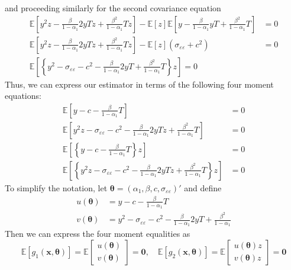 \documentclass[12pt]{article}
\begin{document}
and proceeding similarly for the second covariance equation
\begin{align*}
  \mathbb{E}\left[ y^2z - \frac{\beta}{1 - \alpha_1} 2yTz + \frac{\beta^2}{1 - \alpha_1} Tz \right] - \mathbb{E}[z]\mathbb{E}\left[ y - \frac{\beta}{1 - \alpha_1}yT + \frac{\beta^2}{1 - \alpha_1} T \right] &= 0\\
  \mathbb{E}\left[ y^2z - \frac{\beta}{1 - \alpha_1} 2yTz + \frac{\beta^2}{1 - \alpha_1} Tz \right] - \mathbb{E}[z]\left( \sigma_{\varepsilon\varepsilon} + c^2 \right) &= 0\\
  \mathbb{E}\left[ \left\{y^2 - \sigma_{\varepsilon\varepsilon} - c^2 -\frac{\beta}{1 - \alpha_1} 2yT + \frac{\beta^2}{1 - \alpha_1} T\right\}z \right] = 0 
\end{align*}
Thus, we can express our estimator in terms of the following four moment equations:
\begin{align*}
  \mathbb{E}\left[ y - c -  \frac{\beta}{1 - \alpha_1} T \right] &= 0\\
  \mathbb{E}\left[ y^2z - \sigma_{\varepsilon\varepsilon} - c^2 -\frac{\beta}{1 - \alpha_1} 2yTz + \frac{\beta^2}{1 - \alpha_1} T\right] &= 0 \\
  \mathbb{E}\left[ \left\{y - c -  \frac{\beta}{1 - \alpha_1} T\right\}z \right] &= 0\\
  \mathbb{E}\left[ \left\{y^2z - \sigma_{\varepsilon\varepsilon} - c^2 -\frac{\beta}{1 - \alpha_1} 2yTz + \frac{\beta^2}{1 - \alpha_1} T\right\}z \right] &= 0 
\end{align*}
To simplify the notation, let $\boldsymbol{\theta} = (\alpha_1, \beta, c, \sigma_{\varepsilon\varepsilon})'$ and define
\begin{align*}
  u(\boldsymbol{\theta}) &= y - c - \frac{\beta}{1 - \alpha_1} T\\
  v(\boldsymbol{\theta}) &= y^2 - \sigma_{\varepsilon\varepsilon} - c^2 - \frac{\beta}{1 - \alpha_1} 2yT + \frac{\beta^2}{1 - \alpha_1}
\end{align*}
Then we can express the four moment equalities as 
\[
  \mathbb{E}\left[ g_1(\mathbf{x}, \boldsymbol{\theta}) \right] = \mathbb{E}
  \left[
  \begin{array}{c}
    u(\boldsymbol{\theta})\\ v(\boldsymbol{\theta})
  \end{array}
\right] = \mathbf{0}, \quad
\mathbb{E}\left[ g_2(\mathbf{x}, \boldsymbol{\theta}) \right] = \mathbb{E}
  \left[
  \begin{array}{c}
    u(\boldsymbol{\theta}) z\\ v(\boldsymbol{\theta}) z
  \end{array}
\right] = \mathbf{0}
\]
\end{document}
